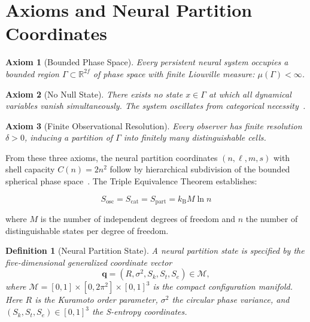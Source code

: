 \documentclass[11pt,twocolumn,a4paper]{article}
\newtheorem{definition}[theorem]{Definition}
\newtheorem{axiom}{Axiom}
\newcommand{\kb}{k_{\mathrm{B}}}
\newcommand{\Sk}{S_k}
\newcommand{\St}{S_t}
\newcommand{\Se}{S_e}
\newcommand{\R}{\mathbb{R}}
\newcommand{\qvec}{\mathbf{q}}
\begin{document}
\section{Axioms and Neural Partition Coordinates}
\label{sec:axioms}

\begin{axiom}[Bounded Phase Space]
\label{ax:bounded}
Every persistent neural system occupies a bounded region $\Gamma \subset \R^{2f}$ of phase space with finite Liouville measure: $\mu(\Gamma) < \infty$.
\end{axiom}

\begin{axiom}[No Null State]
\label{ax:nonull}
There exists no state $x \in \Gamma$ at which all dynamical variables vanish simultaneously.
The system oscillates from categorical necessity~\cite{sachikonye2026gpu}.
\end{axiom}

\begin{axiom}[Finite Observational Resolution]
\label{ax:resolution}
Every observer has finite resolution $\delta > 0$, inducing a partition of $\Gamma$ into finitely many distinguishable cells.
\end{axiom}

From these three axioms, the neural partition coordinates $(n, \ell, m, s)$ with shell capacity $C(n) = 2n^2$ follow by hierarchical subdivision of the bounded spherical phase space~\cite{sachikonye2026operator}.
The Triple Equivalence Theorem establishes:

\begin{equation}
\boxed{S_{\mathrm{osc}} = S_{\mathrm{cat}} = S_{\mathrm{part}} = \kb M \ln n}
\label{eq:triple}
\end{equation}

\noindent where $M$ is the number of independent degrees of freedom and $n$ the number of distinguishable states per degree of freedom.

\begin{definition}[Neural Partition State]
\label{def:neural-partition}
A neural partition state is specified by the five-dimensional generalized coordinate vector
\begin{equation}
\qvec = (R, \sigma^2, \Sk, \St, \Se) \in \mathcal{M},
\label{eq:gencoords}
\end{equation}
where $\mathcal{M} = [0,1] \times [0, 2\pi^2] \times [0,1]^3$ is the compact configuration manifold.
Here $R$ is the Kuramoto order parameter, $\sigma^2$ the circular phase variance, and $(\Sk, \St, \Se) \in [0,1]^3$ the S-entropy coordinates.
\end{definition}
\end{document}
